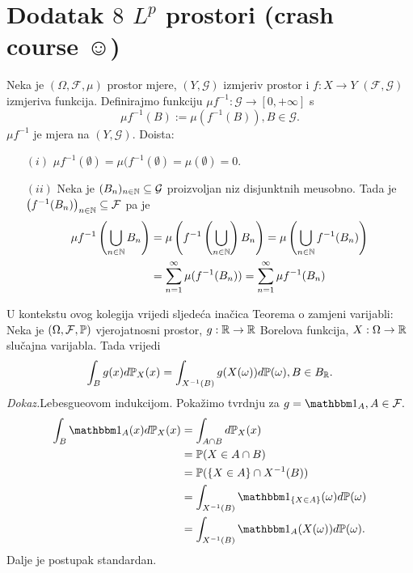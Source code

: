 \documentclass{article}
\begin{document}
\section{Dodatak \(8\) \(L^p\) prostori (crash course \(\smiley\))}
Neka je \((\Omega,\mathcal F,\mu)\) prostor mjere, \((Y,\mathcal G)\) izmjeriv prostor i \(f:X\to Y\) \((\mathcal F,\mathcal G)\) izmjeriva funkcija. Definirajmo funkciju \(\mu f^{-1}:\mathcal G\to[0,+\infty]\) s \[\mu f^{-1}(B):=\mu(f^{-1}(B)),B\in\mathcal G.\] \(\mu f^{-1}\) je mjera na \((Y,\mathcal G).\) Doista:
\begin{itemize}
    \item[\((i)\)] \(\mu f^{-1}(\emptyset)=\mu(f^{-1}(\emptyset)=\mu(\emptyset)=0.\)
    \item[\((ii)\)] Neka je \((B_n)_{n\in\Bbb N}\subseteq\mathcal G\) proizvoljan niz disjunktnih me\dj{}usobno. Tada je \(\left(f^{-1}(B_n)\right)_{n\in\Bbb N}\subseteq\mathcal F\) pa je \[\begin{aligned}\mu f^{-1}\left(\bigcup_{n\in\Bbb N}B_n\right)&=\mu\left(f^{-1}\left(\bigcup_{n\in\Bbb N}\right)B_n\right)=\mu\left(\bigcup_{n\in\Bbb N}f^{-1}(B_n)\right)\\&=\sum_{n=1}^\infty\mu(f^{-1}(B_n))=\sum_{n=1}^\infty\mu f^{-1}(B_n)\end{aligned}\]  
\end{itemize}
U kontekstu ovog kolegija vrijedi sljedeća inačica Teorema o zamjeni varijabli:\newline\newline
Neka je \((\Omega,\mathcal F,\Bbb P)\) vjerojatnosni prostor, \(g:\Bbb R\to\Bbb R\) Borelova funkcija, \(X:\Omega\to\Bbb R\) slučajna varijabla. Tada vrijedi \[\int_B g(x)d\Bbb P_X(x)=\int_{X^{-1}(B)} g(X(\omega))d\Bbb P(\omega), B\in B_\Bbb R.\]
\textit{Dokaz.}\newline Lebesgueovom indukcijom. Pokažimo tvrdnju za \(g=\mathbbm 1_A,A\in\mathcal F.\) \[\begin{aligned}\int_B\mathbbm 1_A(x)d\Bbb P_X(x)&=\int_{A\cap B}d\Bbb P_X(x)\\&=\Bbb P(X\in A\cap B)\\&=\Bbb P(\{X\in A\}\cap X^{-1}(B))\\&=\int_{X^{-1}(B)}\mathbbm 1_{\{X\in A\}}(\omega)d\Bbb P(\omega)\\&=\int_{X^{-1}(B)}\mathbbm 1_A(X(\omega))d\Bbb P(\omega).\end{aligned}\] Dalje je postupak standardan. \newline\newline
\end{document}
